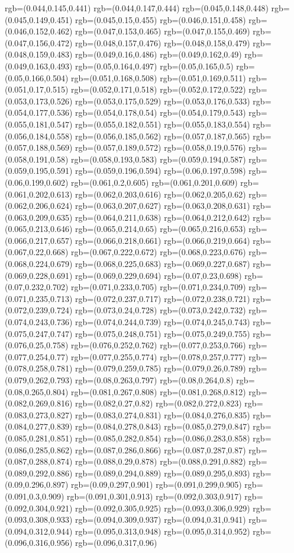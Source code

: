 {{rgb=(0.044,0.145,0.441) rgb=(0.044,0.147,0.444) rgb=(0.045,0.148,0.448) rgb=(0.045,0.149,0.451) rgb=(0.045,0.15,0.455) rgb=(0.046,0.151,0.458) rgb=(0.046,0.152,0.462) rgb=(0.047,0.153,0.465) rgb=(0.047,0.155,0.469) rgb=(0.047,0.156,0.472) rgb=(0.048,0.157,0.476) rgb=(0.048,0.158,0.479) rgb=(0.048,0.159,0.483) rgb=(0.049,0.16,0.486) rgb=(0.049,0.162,0.49) rgb=(0.049,0.163,0.493) rgb=(0.05,0.164,0.497) rgb=(0.05,0.165,0.5) rgb=(0.05,0.166,0.504) rgb=(0.051,0.168,0.508) rgb=(0.051,0.169,0.511) rgb=(0.051,0.17,0.515) rgb=(0.052,0.171,0.518) rgb=(0.052,0.172,0.522) rgb=(0.053,0.173,0.526) rgb=(0.053,0.175,0.529) rgb=(0.053,0.176,0.533) rgb=(0.054,0.177,0.536) rgb=(0.054,0.178,0.54) rgb=(0.054,0.179,0.543) rgb=(0.055,0.181,0.547) rgb=(0.055,0.182,0.551) rgb=(0.055,0.183,0.554) rgb=(0.056,0.184,0.558) rgb=(0.056,0.185,0.562) rgb=(0.057,0.187,0.565) rgb=(0.057,0.188,0.569) rgb=(0.057,0.189,0.572) rgb=(0.058,0.19,0.576) rgb=(0.058,0.191,0.58) rgb=(0.058,0.193,0.583) rgb=(0.059,0.194,0.587) rgb=(0.059,0.195,0.591) rgb=(0.059,0.196,0.594) rgb=(0.06,0.197,0.598) rgb=(0.06,0.199,0.602) rgb=(0.061,0.2,0.605) rgb=(0.061,0.201,0.609) rgb=(0.061,0.202,0.613) rgb=(0.062,0.203,0.616) rgb=(0.062,0.205,0.62) rgb=(0.062,0.206,0.624) rgb=(0.063,0.207,0.627) rgb=(0.063,0.208,0.631) rgb=(0.063,0.209,0.635) rgb=(0.064,0.211,0.638) rgb=(0.064,0.212,0.642) rgb=(0.065,0.213,0.646) rgb=(0.065,0.214,0.65) rgb=(0.065,0.216,0.653) rgb=(0.066,0.217,0.657) rgb=(0.066,0.218,0.661) rgb=(0.066,0.219,0.664) rgb=(0.067,0.22,0.668) rgb=(0.067,0.222,0.672) rgb=(0.068,0.223,0.676) rgb=(0.068,0.224,0.679) rgb=(0.068,0.225,0.683) rgb=(0.069,0.227,0.687) rgb=(0.069,0.228,0.691) rgb=(0.069,0.229,0.694) rgb=(0.07,0.23,0.698) rgb=(0.07,0.232,0.702) rgb=(0.071,0.233,0.705) rgb=(0.071,0.234,0.709) rgb=(0.071,0.235,0.713) rgb=(0.072,0.237,0.717) rgb=(0.072,0.238,0.721) rgb=(0.072,0.239,0.724) rgb=(0.073,0.24,0.728) rgb=(0.073,0.242,0.732) rgb=(0.074,0.243,0.736) rgb=(0.074,0.244,0.739) rgb=(0.074,0.245,0.743) rgb=(0.075,0.247,0.747) rgb=(0.075,0.248,0.751) rgb=(0.075,0.249,0.755) rgb=(0.076,0.25,0.758) rgb=(0.076,0.252,0.762) rgb=(0.077,0.253,0.766) rgb=(0.077,0.254,0.77) rgb=(0.077,0.255,0.774) rgb=(0.078,0.257,0.777) rgb=(0.078,0.258,0.781) rgb=(0.079,0.259,0.785) rgb=(0.079,0.26,0.789) rgb=(0.079,0.262,0.793) rgb=(0.08,0.263,0.797) rgb=(0.08,0.264,0.8) rgb=(0.08,0.265,0.804) rgb=(0.081,0.267,0.808) rgb=(0.081,0.268,0.812) rgb=(0.082,0.269,0.816) rgb=(0.082,0.27,0.82) rgb=(0.082,0.272,0.823) rgb=(0.083,0.273,0.827) rgb=(0.083,0.274,0.831) rgb=(0.084,0.276,0.835) rgb=(0.084,0.277,0.839) rgb=(0.084,0.278,0.843) rgb=(0.085,0.279,0.847) rgb=(0.085,0.281,0.851) rgb=(0.085,0.282,0.854) rgb=(0.086,0.283,0.858) rgb=(0.086,0.285,0.862) rgb=(0.087,0.286,0.866) rgb=(0.087,0.287,0.87) rgb=(0.087,0.288,0.874) rgb=(0.088,0.29,0.878) rgb=(0.088,0.291,0.882) rgb=(0.089,0.292,0.886) rgb=(0.089,0.294,0.889) rgb=(0.089,0.295,0.893) rgb=(0.09,0.296,0.897) rgb=(0.09,0.297,0.901) rgb=(0.091,0.299,0.905) rgb=(0.091,0.3,0.909) rgb=(0.091,0.301,0.913) rgb=(0.092,0.303,0.917) rgb=(0.092,0.304,0.921) rgb=(0.092,0.305,0.925) rgb=(0.093,0.306,0.929) rgb=(0.093,0.308,0.933) rgb=(0.094,0.309,0.937) rgb=(0.094,0.31,0.941) rgb=(0.094,0.312,0.944) rgb=(0.095,0.313,0.948) rgb=(0.095,0.314,0.952) rgb=(0.096,0.316,0.956) rgb=(0.096,0.317,0.96) }}
